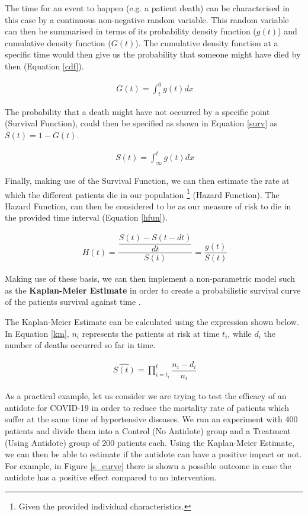The time for an event to happen (e.g. a patient death) can be characterised in this case by a continuous non-negative random variable. This random variable can then be summarised in terms of its probability density function ($g(t)$) and cumulative density function ($G(t)$). The cumulative density function at a specific time would then give us the probability that someone might have died by then (Equation \ref{cdf}).

\useshortskip
\begin{align}
\ G(t) =\int_{t}^{0} g(t) dx
\label{cdf}
\end{align}
\useshortskip

The probability that a death might have not occurred by a specific point (Survival Function), could then be specified as shown in Equation \ref{surv} as $S(t) = 1 - G(t)$.

\useshortskip
\begin{align}
\ S(t) =\int_{\infty}^{t} g(t) dx
\label{surv}
\end{align}
\useshortskip

Finally, making use of the Survival Function, we can then estimate the rate at which the different patients die in our population \footnote{Given the provided individual characteristics.} (Hazard Function). The Hazard Function, can then be considered to be as our measure of risk to die in the provided time interval (Equation \ref{hfun}).

\useshortskip
\begin{align}
\ H(t) = \dfrac{\dfrac{S(t) - S(t - dt)}{dt}}{S(t)} = \dfrac{g(t)}{S(t)}
\label{hfun}
\end{align}
\useshortskip

Making use of these basis, we can then implement a non-parametric model such as the \textbf{Kaplan-Meier Estimate} in order to create a probabilistic survival curve of the patients survival against time \cite{survival_an}.

The Kaplan-Meier Estimate can be calculated using the expression shown below. In Equation \ref{km}, $n_{i}$ represents the patients at risk at time $t_{i}$, while $d_{i}$ the number of deaths occurred so far in time.

\useshortskip
\begin{align}
\ \widehat{S(t)} = \prod_{i=t_{i}}^{t} \dfrac{n_{i}-d_{i}}{n_{i}}
\label{km}
\end{align}
\useshortskip

As a practical example, let us consider we are trying to test the efficacy of an antidote for COVID-19 in order to reduce the mortality rate of patients which suffer at the same time of hypertensive diseases. We run an experiment with 400 patients and divide them into a Control (No Antidote) group and a Treatment (Using Antidote) group of 200 patients each. Using the Kaplan-Meier Estimate, we can then be able to estimate if the antidote can have a positive impact or not. For example, in Figure \ref{s_curve} there is shown a possible outcome in case the antidote has a positive effect compared to no intervention.

